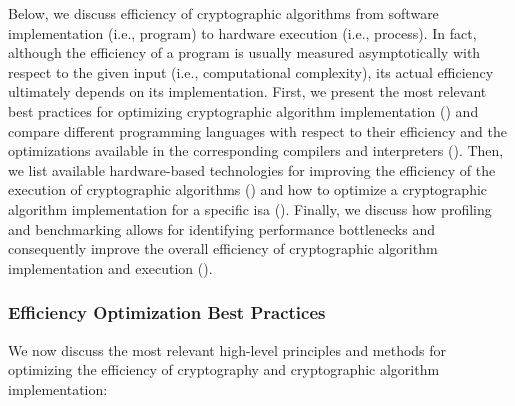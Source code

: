 Below, we discuss efficiency of cryptographic algorithms from software implementation (i.e., program) to hardware execution (i.e., process). In fact, although the efficiency of a program is usually measured asymptotically with respect to the given input (i.e., computational complexity), its actual efficiency ultimately depends on its implementation. First, we present the most relevant best practices for optimizing cryptographic algorithm implementation () and compare  different programming languages with respect to their efficiency and the optimizations available in the corresponding compilers and interpreters (). Then, we list available hardware-based technologies for improving the efficiency of the execution of cryptographic algorithms () and how to optimize a cryptographic algorithm implementation for a specific \gls{isa} (). Finally, we discuss how profiling and benchmarking allows for identifying performance bottlenecks and consequently improve the overall efficiency of cryptographic algorithm implementation and execution ().



\subsubsection{Efficiency Optimization Best Practices}\label{sec:security_of_cryptographic_algorithms:performance:best_practices}

We now discuss the most relevant high-level principles and methods for optimizing the efficiency of cryptography and cryptographic algorithm implementation:

